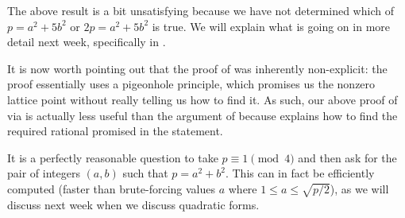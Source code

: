 \documentclass[../notes.tex]{subfiles}
\begin{document}
The above result is a bit unsatisfying because we have not determined which of $p=a^2+5b^2$ or $2p=a^2+5b^2$ is true. We will explain what is going on in more detail next week, specifically in .

It is now worth pointing out that the proof of  was inherently non-explicit: the proof essentially uses a pigeonhole principle, which promises us the nonzero lattice point without really telling us how to find it. As such, our above proof of  via  is actually less useful than the argument of  because  explains how to find the required rational promised in the statement.

It is a perfectly reasonable question to take $p\equiv1\pmod4$ and then ask for the pair of integers $(a,b)$ such that $p=a^2+b^2$. This can in fact be efficiently computed (faster than brute-forcing values $a$ where $1\le a\le\sqrt{p/2}$), as we will discuss next week when we discuss quadratic forms.
\end{document}

